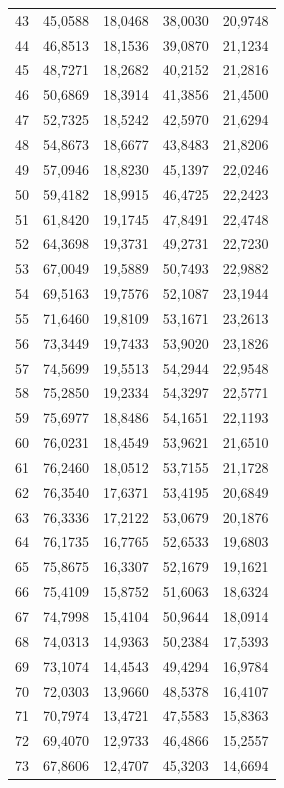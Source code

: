 \begin{small}
\begin{longtable}{rrrrr}
43 & 45,0588 & 18,0468 & 38,0030 & 20,9748 \\
44 & 46,8513 & 18,1536 & 39,0870 & 21,1234 \\
45 & 48,7271 & 18,2682 & 40,2152 & 21,2816 \\
46 & 50,6869 & 18,3914 & 41,3856 & 21,4500 \\
47 & 52,7325 & 18,5242 & 42,5970 & 21,6294 \\
48 & 54,8673 & 18,6677 & 43,8483 & 21,8206 \\
49 & 57,0946 & 18,8230 & 45,1397 & 22,0246 \\
50 & 59,4182 & 18,9915 & 46,4725 & 22,2423 \\
51 & 61,8420 & 19,1745 & 47,8491 & 22,4748 \\
52 & 64,3698 & 19,3731 & 49,2731 & 22,7230 \\
53 & 67,0049 & 19,5889 & 50,7493 & 22,9882 \\
54 & 69,5163 & 19,7576 & 52,1087 & 23,1944 \\
55 & 71,6460 & 19,8109 & 53,1671 & 23,2613 \\
56 & 73,3449 & 19,7433 & 53,9020 & 23,1826 \\
57 & 74,5699 & 19,5513 & 54,2944 & 22,9548 \\
58 & 75,2850 & 19,2334 & 54,3297 & 22,5771 \\
59 & 75,6977 & 18,8486 & 54,1651 & 22,1193 \\
60 & 76,0231 & 18,4549 & 53,9621 & 21,6510 \\
61 & 76,2460 & 18,0512 & 53,7155 & 21,1728 \\
62 & 76,3540 & 17,6371 & 53,4195 & 20,6849 \\
63 & 76,3336 & 17,2122 & 53,0679 & 20,1876 \\
64 & 76,1735 & 16,7765 & 52,6533 & 19,6803 \\
65 & 75,8675 & 16,3307 & 52,1679 & 19,1621 \\
66 & 75,4109 & 15,8752 & 51,6063 & 18,6324 \\
67 & 74,7998 & 15,4104 & 50,9644 & 18,0914 \\
68 & 74,0313 & 14,9363 & 50,2384 & 17,5393 \\
69 & 73,1074 & 14,4543 & 49,4294 & 16,9784 \\
70 & 72,0303 & 13,9660 & 48,5378 & 16,4107 \\
71 & 70,7974 & 13,4721 & 47,5583 & 15,8363 \\
72 & 69,4070 & 12,9733 & 46,4866 & 15,2557 \\
73 & 67,8606 & 12,4707 & 45,3203 & 14,6694 \\

\end{longtable}
\end{small}
